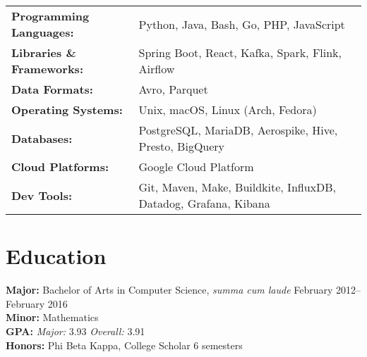 \documentclass[10pt]{resume}
\begin{document}
\begin{tabular}{>{\bfseries}l l}
Programming Languages:  &  Python, Java, Bash, Go, PHP, JavaScript                         \\
Libraries \& Frameworks:&  Spring Boot, React, Kafka, Spark, Flink, Airflow                \\
Data Formats:           &  Avro, Parquet                                                   \\
Operating Systems:      &  Unix, macOS, Linux (Arch, Fedora)                               \\
Databases:              &  PostgreSQL, MariaDB, Aerospike, Hive, Presto, BigQuery          \\
Cloud Platforms:        &  Google Cloud Platform                                           \\
Dev Tools:              &  Git, Maven, Make, Buildkite, InfluxDB, Datadog, Grafana, Kibana \\
\end{tabular}

\section{Education}

\textbf{Major:} Bachelor of Arts in Computer Science, \textit{summa cum laude} \hfill February 2012--February 2016\\
\textbf{Minor:} Mathematics\\
\textbf{GPA:} \textit{Major:} 3.93 \textit{Overall:} 3.91\\
\textbf{Honors:} Phi Beta Kappa, College Scholar 6 semesters
\end{document}
